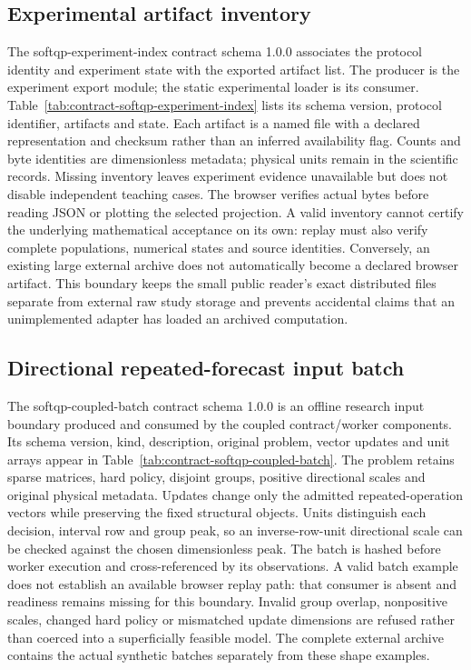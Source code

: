 \subsection{Experimental artifact inventory}\label{sec:contract-softqp-experiment-index}
The softqp-experiment-index contract schema 1.0.0 associates the protocol
identity and experiment state with the exported artifact list. The producer
is the experiment export module; the static experimental loader is its
consumer. Table~\ref{tab:contract-softqp-experiment-index} lists its schema
version, protocol identifier, artifacts and state. Each artifact is a named
file with a declared representation and checksum rather than an inferred
availability flag. Counts and byte identities are dimensionless metadata;
physical units remain in the scientific records. Missing inventory leaves
experiment evidence unavailable but does not disable independent teaching
cases. The browser verifies actual bytes before reading JSON or plotting
the selected projection. A valid inventory cannot certify the underlying
mathematical acceptance on its own: replay must also verify complete
populations, numerical states and source identities. Conversely, an existing
large external archive does not automatically become a declared browser
artifact. This boundary keeps the small public reader's exact distributed
files separate from external raw study storage and prevents accidental
claims that an unimplemented adapter has loaded an archived computation.


\subsection{Directional repeated-forecast input batch}\label{sec:contract-softqp-coupled-batch}
The softqp-coupled-batch contract schema 1.0.0 is an offline research input
boundary produced and consumed by the coupled contract/worker components.
Its schema version, kind, description, original problem, vector updates and
unit arrays appear in Table~\ref{tab:contract-softqp-coupled-batch}. The
problem retains sparse matrices, hard policy, disjoint groups, positive
directional scales and original physical metadata. Updates change only
the admitted repeated-operation vectors while preserving the fixed structural
objects. Units distinguish each decision, interval row and group peak, so
an inverse-row-unit directional scale can be checked against the chosen
dimensionless peak. The batch is hashed before worker execution and
cross-referenced by its observations. A valid batch example does not
establish an available browser replay path: that consumer is absent and
readiness remains missing for this boundary. Invalid group overlap,
nonpositive scales, changed hard policy or mismatched update dimensions
are refused rather than coerced into a superficially feasible model. The
complete external archive contains the actual synthetic batches separately
from these shape examples.


